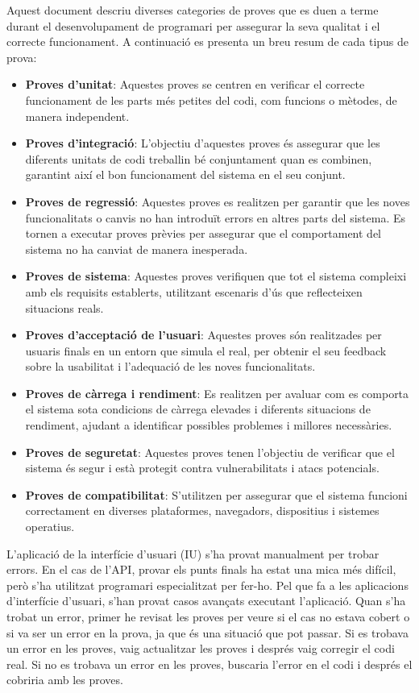\documentclass[a4paper,12pt,twoside]{ThesisStyle}
\begin{document}
Aquest document descriu diverses categories de proves que es duen a terme durant el desenvolupament de programari per assegurar la seva qualitat i el correcte funcionament. A continuació es presenta un breu resum de cada tipus de prova:

\begin{itemize}
\item \textbf{Proves d'unitat}: Aquestes proves se centren en verificar el correcte funcionament de les parts més petites del codi, com funcions o mètodes, de manera independent.
\item \textbf{Proves d'integració}: L'objectiu d'aquestes proves és assegurar que les diferents unitats de codi treballin bé conjuntament quan es combinen, garantint així el bon funcionament del sistema en el seu conjunt.
\item \textbf{Proves de regressió}: Aquestes proves es realitzen per garantir que les noves funcionalitats o canvis no han introduït errors en altres parts del sistema. Es tornen a executar proves prèvies per assegurar que el comportament del sistema no ha canviat de manera inesperada.
\item \textbf{Proves de sistema}: Aquestes proves verifiquen que tot el sistema compleixi amb els requisits establerts, utilitzant escenaris d'ús que reflecteixen situacions reals.
\item \textbf{Proves d'acceptació de l'usuari}: Aquestes proves són realitzades per usuaris finals en un entorn que simula el real, per obtenir el seu feedback sobre la usabilitat i l'adequació de les noves funcionalitats.
\item \textbf{Proves de càrrega i rendiment}: Es realitzen per avaluar com es comporta el sistema sota condicions de càrrega elevades i diferents situacions de rendiment, ajudant a identificar possibles problemes i millores necessàries.
\item \textbf{Proves de seguretat}: Aquestes proves tenen l'objectiu de verificar que el sistema és segur i està protegit contra vulnerabilitats i atacs potencials.
\item \textbf{Proves de compatibilitat}: S'utilitzen per assegurar que el sistema funcioni correctament en diverses plataformes, navegadors, dispositius i sistemes operatius.
\end{itemize}

L'aplicació de la interfície d'usuari (IU) s'ha provat manualment per trobar errors. En el cas de l'API, provar els punts finals ha estat una mica més difícil, però s'ha utilitzat programari especialitzat per fer-ho. Pel que fa a les aplicacions d'interfície d'usuari, s'han provat casos avançats executant l'aplicació. Quan s'ha trobat un error, primer he revisat les proves per veure si el cas no estava cobert o si va ser un error en la prova, ja que és una situació que pot passar. Si es trobava un error en les proves, vaig actualitzar les proves i després vaig corregir el codi real. Si no es trobava un error en les proves, buscaria l'error en el codi i després el cobriria amb les proves.
\end{document}
